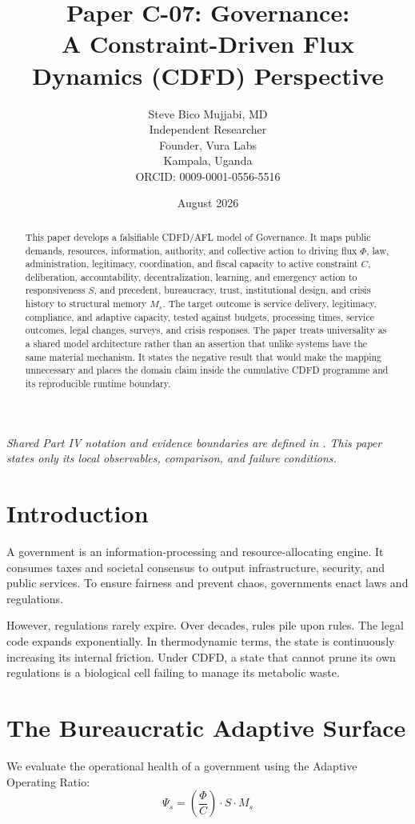 \documentclass[11pt,a4paper]{article}
\title{\textbf{Paper C-07: Governance:\\ A Constraint-Driven Flux Dynamics (CDFD) Perspective}}
\author{Steve Bico Mujjabi, MD\\
\small Independent Researcher\\
\small Founder, Vura Labs\\
\small Kampala, Uganda\\
\small ORCID: 0009-0001-0556-5516}
\date{August 2026}
\begin{document}
\maketitle

\noindent\textit{Shared Part IV notation and evidence boundaries are defined in . This paper states only its local observables, comparison, and failure conditions.}


\begin{abstract}
This paper develops a falsifiable CDFD/AFL model of Governance. It maps public demands, resources, information, authority, and collective action to driving flux $\Phi$, law, administration, legitimacy, coordination, and fiscal capacity to active constraint $C$, deliberation, accountability, decentralization, learning, and emergency action to responsiveness $S$, and precedent, bureaucracy, trust, institutional design, and crisis history to structural memory $M_s$. The target outcome is service delivery, legitimacy, compliance, and adaptive capacity, tested against budgets, processing times, service outcomes, legal changes, surveys, and crisis responses. The paper treats universality as a shared model architecture rather than an assertion that unlike systems have the same material mechanism. It states the negative result that would make the mapping unnecessary and places the domain claim inside the cumulative CDFD programme and its reproducible runtime boundary.
\end{abstract}

\section{Introduction}

A government is an information-processing and resource-allocating engine. It consumes taxes and societal consensus to output infrastructure, security, and public services. To ensure fairness and prevent chaos, governments enact laws and regulations.

However, regulations rarely expire. Over decades, rules pile upon rules. The legal code expands exponentially. In thermodynamic terms, the state is continuously increasing its internal friction. Under CDFD, a state that cannot prune its own regulations is a biological cell failing to manage its metabolic waste.

\section{The Bureaucratic Adaptive Surface}
We evaluate the operational health of a government using the Adaptive Operating Ratio:
\begin{equation}
    \Psi_s = \left( \frac{\Phi}{C} \right) \cdot S \cdot M_s
\end{equation}
\end{document}
